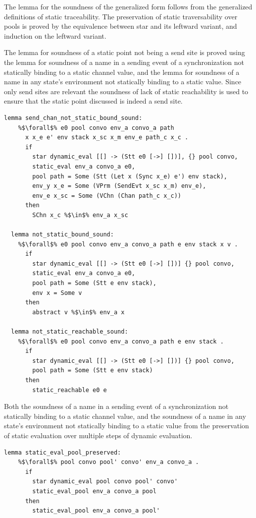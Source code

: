 \documentclass{article}
\begin{document}
The lemma for the soundness of the generalized form follows from the generalized definitions
of static traceability. The preservation of static traversability over pools is proved by the
equivalence between star and its leftward variant, and induction on the leftward variant.

The lemma for soundness of a static point not being a send site is proved using the lemma for
soundness of a name in a sending event of a synchronization not statically binding to a static
channel value, and the lemma for soundness of a name in any state's environment
not statically binding to a static value.  Since only send sites are relevant
the soundness of lack of static reachability is
used to ensure that the static point discussed is indeed a send site. 

\begin{lstlisting}[language=logic, escapechar=\%]
  lemma send_chan_not_static_bound_sound:
    %$\forall$% e0 pool convo env_a convo_a path
      x x_e e' env stack x_sc x_m env_e path_c x_c .
      if
        star dynamic_eval [[] -> (Stt e0 [->] [])], {} pool convo,
        static_eval env_a convo_a e0,
        pool path = Some (Stt (Let x (Sync x_e) e') env stack),
        env_y x_e = Some (VPrm (SendEvt x_sc x_m) env_e),
        env_e x_sc = Some (VChn (Chan path_c x_c))
      then
        SChn x_c %$\in$% env_a x_sc

  lemma not_static_bound_sound:
    %$\forall$% e0 pool convo env_a convo_a path e env stack x v .
      if
        star dynamic_eval [[] -> (Stt e0 [->] [])] {} pool convo,
        static_eval env_a convo_a e0, 
        pool path = Some (Stt e env stack), 
        env x = Some v
      then
        abstract v %$\in$% env_a x

  lemma not_static_reachable_sound:
    %$\forall$% e0 pool convo env_a convo_a path e env stack .
      if
        star dynamic_eval [[] -> (Stt e0 [->] [])] {} pool convo,
        pool path = Some (Stt e env stack)
      then
        static_reachable e0 e
\end{lstlisting}

Both the soundness of a name in a sending event of a synchronization not statically binding
to a static
channel value, and the soundness of a name in any state's environment not statically binding
to a static value from the preservation of static evaluation over multiple steps of dynamic
evaluation.

\begin{lstlisting}[language=logic, escapechar=\%]
  lemma static_eval_pool_preserved:
    %$\forall$% pool convo pool' convo' env_a convo_a .
      if
        star dynamic_eval pool convo pool' convo' 
        static_eval_pool env_a convo_a pool
      then
        static_eval_pool env_a convo_a pool'
\end{lstlisting}
\end{document}
